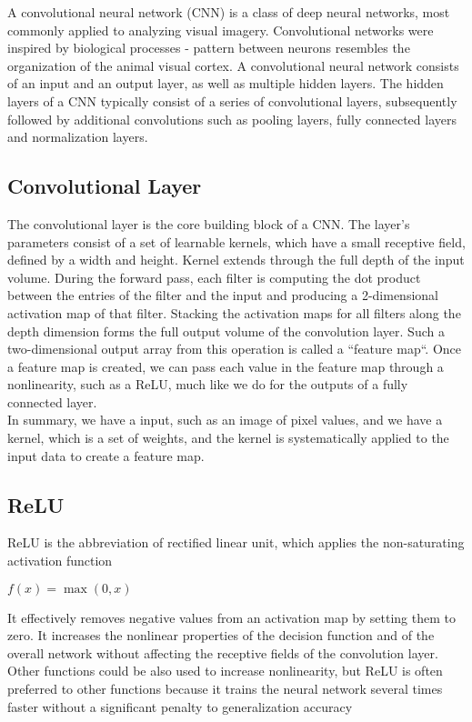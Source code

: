 A convolutional neural network (CNN) is a class of deep neural networks, most commonly applied to analyzing visual imagery. Convolutional networks were inspired by biological processes - pattern between neurons resembles the organization of the animal visual cortex. A convolutional neural network consists of an input and an output layer, as well as multiple hidden layers. The hidden layers of a CNN typically consist of a series of convolutional layers, subsequently followed by additional convolutions such as pooling layers, fully connected layers and normalization layers.\\

\subsection{Convolutional Layer}
The convolutional layer is the core building block of a CNN. The layer's parameters consist of a set of learnable kernels, which have a small receptive field, defined by a width and height. Kernel extends through the full depth of the input volume. During the forward pass, each filter is computing the dot product between the entries of the filter and the input and producing a 2-dimensional activation map of that filter. Stacking the activation maps for all filters along the depth dimension forms the full output volume of the convolution layer. Such a two-dimensional output array from this operation is called a “feature map“. Once a feature map is created, we can pass each value in the feature map through a nonlinearity, such as a ReLU, much like we do for the outputs of a fully connected layer.\\
In summary, we have a input, such as an image of pixel values, and we have a kernel, which is a set of weights, and the kernel is systematically applied to the input data to create a feature map.

\subsection{ReLU}
ReLU is the abbreviation of rectified linear unit, which applies the non-saturating activation function
\begin{center}
    $f(x)=\max(0,x)$
\end{center}
It effectively removes negative values from an activation map by setting them to zero. It increases the nonlinear properties of the decision function and of the overall network without affecting the receptive fields of the convolution layer.\\
Other functions could be also used to increase nonlinearity, but ReLU is often preferred to other functions because it trains the neural network several times faster without a significant penalty to generalization accuracy

